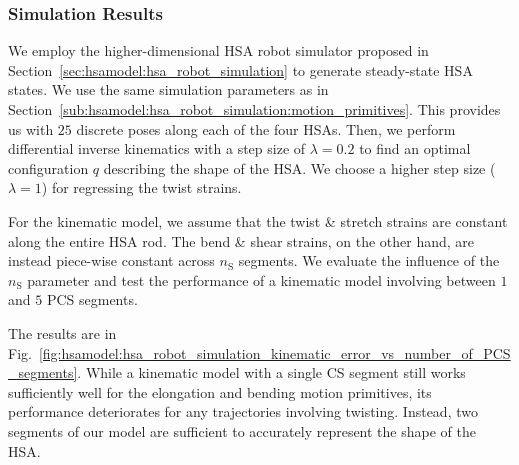 
\subsubsection{Simulation Results}\label{ssub:hsamodel:hsa_rod_kinematics:simulation_results}
%
We employ the higher-dimensional \gls{HSA} robot simulator proposed in Section~\ref{sec:hsamodel:hsa_robot_simulation} to generate steady-state \gls{HSA} states. We use the same simulation parameters as in Section~\ref{sub:hsamodel:hsa_robot_simulation:motion_primitives}. This provides us with $25$ discrete poses along each of the four \glspl{HSA}.
Then, we perform differential inverse kinematics with a step size of $\lambda = 0.2$ to find an optimal configuration $q$ describing the shape of the \gls{HSA}. We choose a higher step size ($\lambda=1$) for regressing the twist strains.

For the kinematic model, we assume that the twist \& stretch strains are constant along the entire \gls{HSA} rod. The bend \& shear strains, on the other hand, are instead piece-wise constant across $n_\mathrm{S}$ segments. We evaluate the influence of the $n_\mathrm{S}$ parameter and test the performance of a kinematic model involving between $1$ and $5$ \gls{PCS} segments.

The results are in Fig.~\ref{fig:hsamodel:hsa_robot_simulation_kinematic_error_vs_number_of_PCS_segments}. While a kinematic model with a single \gls{CS} segment still works sufficiently well for the elongation and bending motion primitives, its performance deteriorates for any trajectories involving twisting. Instead, two segments of our model are sufficient to accurately represent the shape of the \gls{HSA}. 


